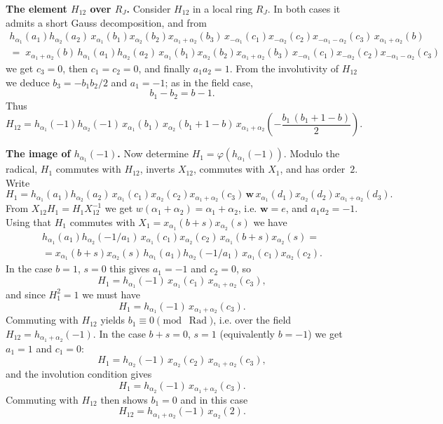 \documentclass[]{jgcc}
\DeclareMathOperator{\Rad}{Rad}
\numberwithin{equation}{section}
\begin{document}
\medskip
\noindent\textbf{The element $H_{12}$ over $R_J$.}
Consider $H_{12}$ in a local ring $R_J$.
In both cases it admits a short Gauss decomposition, and from
\begin{multline*}
h_{\alpha_1}(a_1)h_{\alpha_2}(a_2)\,x_{\alpha_1}(b_1)x_{\alpha_2}(b_2)x_{\alpha_1+\alpha_2}(b_3)\,
x_{-\alpha_1}(c_1)x_{-\alpha_2}(c_2)x_{-\alpha_1-\alpha_2}(c_3)\,x_{\alpha_1+\alpha_2}(b)\\
=\;
x_{\alpha_1+\alpha_2}(b)\,
h_{\alpha_1}(a_1)h_{\alpha_2}(a_2)\,x_{\alpha_1}(b_1)x_{\alpha_2}(b_2)x_{\alpha_1+\alpha_2}(b_3)\,
x_{-\alpha_1}(c_1)x_{-\alpha_2}(c_2)x_{-\alpha_1-\alpha_2}(c_3)
\end{multline*}
we get $c_3=0$, then $c_1=c_2=0$, and finally $a_1a_2=1$.
From the involutivity of $H_{12}$ we deduce $b_3=-b_1b_2/2$ and $a_1=-1$; as in the field case,
\[
b_1-b_2=b-1.
\]
Thus
\[
H_{12}=h_{\alpha_1}(-1)h_{\alpha_2}(-1)\,
x_{\alpha_1}(b_1)\,x_{\alpha_2}(b_1{+}1{-}b)\,
x_{\alpha_1+\alpha_2}\!\left(-\frac{b_1\,(b_1{+}1{-}b)}{2}\right).
\]

\medskip
\noindent\textbf{The image of $h_{\alpha_1}(-1)$.}
Now determine $H_1=\varphi(h_{\alpha_1}(-1))$.
Modulo the radical, $H_1$ commutes with $H_{12}$, inverts $X_{12}$, commutes with $X_1$, and has order~$2$.
Write
\[
H_1=h_{\alpha_1}(a_1)h_{\alpha_2}(a_2)\,x_{\alpha_1}(c_1)x_{\alpha_2}(c_2)x_{\alpha_1+\alpha_2}(c_3)\,\mathbf w\,
x_{\alpha_1}(d_1)x_{\alpha_2}(d_2)x_{\alpha_1+\alpha_2}(d_3).
\]
From $X_{12}H_1=H_1X_{12}^{-1}$ we get $w(\alpha_1+\alpha_2)=\alpha_1+\alpha_2$, i.e. $\mathbf w=e$, and $a_1a_2=-1$.
Using that $H_1$ commutes with $X_1=x_{\alpha_1}(b+s)x_{\alpha_2}(s)$ we have
\begin{multline*}
h_{\alpha_1}(a_1)h_{\alpha_2}(-1/a_1)\,x_{\alpha_1}(c_1)x_{\alpha_2}(c_2)\,x_{\alpha_1}(b+s)x_{\alpha_2}(s)
=\\
=x_{\alpha_1}(b+s)x_{\alpha_2}(s)\,h_{\alpha_1}(a_1)h_{\alpha_2}(-1/a_1)\,x_{\alpha_1}(c_1)x_{\alpha_2}(c_2).
\end{multline*}
In the case $b=1$, $s=0$ this gives $a_1=-1$ and $c_2=0$, so
\[
H_1=h_{\alpha_1}(-1)\,x_{\alpha_1}(c_1)\,x_{\alpha_1+\alpha_2}(c_3),
\]
and since $H_1^2=1$ we must have
\[
H_1=h_{\alpha_1}(-1)\,x_{\alpha_1+\alpha_2}(c_3).
\]
Commuting with $H_{12}$ yields $b_1\equiv0\pmod{\Rad}$, i.e. over the field $H_{12}=h_{\alpha_1+\alpha_2}(-1)$.
In the case $b+s=0$, $s=1$ (equivalently $b=-1$) we get $a_1=1$ and $c_1=0$:
\[
H_1=h_{\alpha_2}(-1)\,x_{\alpha_2}(c_2)\,x_{\alpha_1+\alpha_2}(c_3),
\]
and the involution condition gives
\[
H_1=h_{\alpha_2}(-1)\,x_{\alpha_1+\alpha_2}(c_3).
\]
Commuting with $H_{12}$ then shows $b_1=0$ and in this case
\[
H_{12}=h_{\alpha_1+\alpha_2}(-1)\,x_{\alpha_2}(2).
\]
\end{document}
